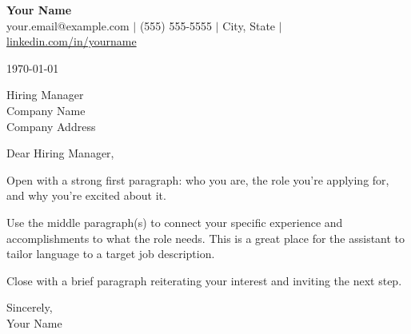 \documentclass[11pt]{article}
\begin{document}
\textbf{Your Name} \\
your.email@example.com \; $\vert$ \; (555) 555-5555 \; $\vert$ \; City, State \; $\vert$ \; \href{https://linkedin.com/in/yourname}{linkedin.com/in/yourname}

\vspace{18pt}
\today

\vspace{18pt}
Hiring Manager \\
Company Name \\
Company Address

\vspace{18pt}
Dear Hiring Manager,

Open with a strong first paragraph: who you are, the role you're applying for, and why you're excited about it.

Use the middle paragraph(s) to connect your specific experience and accomplishments to what the role needs. This is a great place for the assistant to tailor language to a target job description.

Close with a brief paragraph reiterating your interest and inviting the next step.

\vspace{18pt}
Sincerely, \\
Your Name
\end{document}
